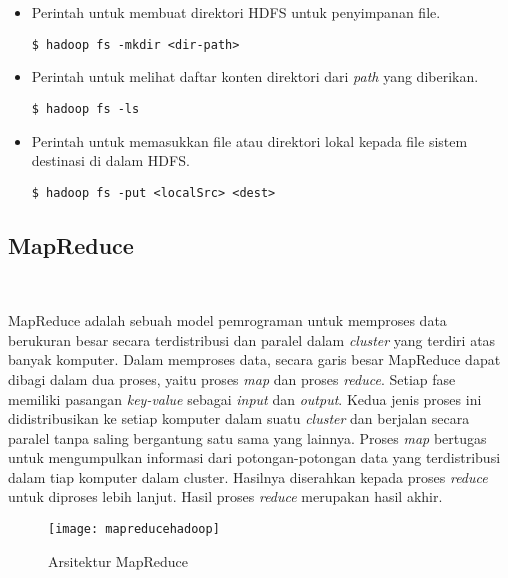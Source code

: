 \begin{itemize}
\item Perintah untuk membuat direktori HDFS untuk penyimpanan file.

\begin{verbatim}
$ hadoop fs -mkdir <dir-path>
\end{verbatim}
 
\item Perintah untuk melihat daftar konten direktori dari \textit{path} yang diberikan.

\begin{verbatim}
$ hadoop fs -ls 
\end{verbatim}

\item Perintah untuk memasukkan file atau direktori lokal kepada file sistem destinasi di dalam HDFS.

\begin{verbatim}
$ hadoop fs -put <localSrc> <dest> 
\end{verbatim}

\end{itemize}


\subsection{MapReduce}~\cite{tomwhite:05:htdg}

MapReduce adalah sebuah model pemrograman untuk memproses data berukuran besar secara terdistribusi dan paralel dalam \textit{cluster} yang terdiri atas banyak komputer. Dalam memproses data, secara garis besar MapReduce dapat dibagi dalam dua proses, yaitu proses \textit{map} dan proses \textit{reduce}. Setiap fase memiliki pasangan \textit{key-value} sebagai \textit{input} dan \textit{output}. Kedua jenis proses ini didistribusikan ke setiap komputer dalam suatu \textit{cluster} dan berjalan secara paralel tanpa saling bergantung satu sama yang lainnya. Proses \textit{map} bertugas untuk mengumpulkan informasi dari potongan-potongan data yang terdistribusi dalam tiap komputer dalam cluster. Hasilnya diserahkan kepada proses \textit{reduce} untuk diproses lebih lanjut. Hasil proses \textit{reduce} merupakan hasil akhir.\\

\begin{figure}[H]
    \centering  
    \texttt{[image: mapreducehadoop]}  
    \caption[Arsitektur MapReduce]{Arsitektur MapReduce} 
    \label{fig:mapreducehadoop} 
\end{figure}

